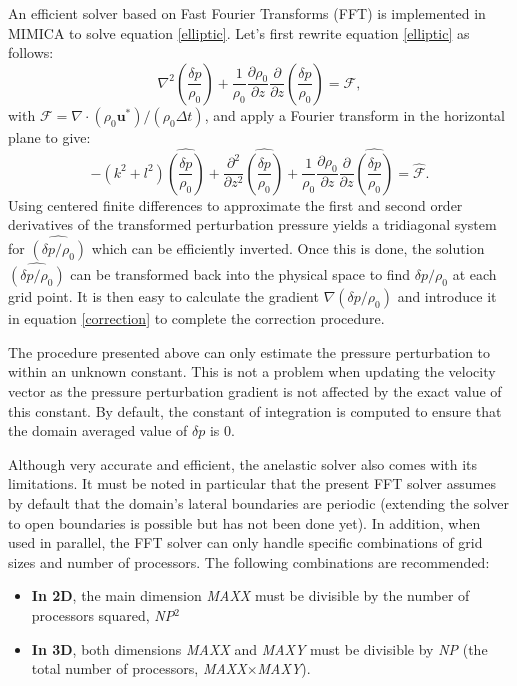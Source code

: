 \documentclass[12pt,A4,french]{article}
\begin{document}
An efficient solver based on Fast Fourier Transforms (FFT) is implemented in MIMICA to solve equation \ref{elliptic}. Let's first rewrite equation \ref{elliptic} as follows:
\begin{equation}
\nabla^{2}\left(\frac{\delta p}{\rho_0}\right) + \frac{1}{\rho_0}\frac{\partial \rho_0}{\partial z}\frac{\partial}{\partial z}\left(\frac{\delta p}{\rho_0}\right) = \mathcal{F},
\end{equation}
with $\mathcal{F}=\nabla\cdot\left(\rho_0 {\mathbf u}^{*}\right) / \left(\rho_0 \Delta t\right)$, and apply a Fourier transform in the horizontal plane to give:
\begin{equation}
-\left(k^{2} + l^{2}\right)\widehat{\left(\frac{\delta p}{\rho_0}\right)} + \frac{\partial^{2}}{\partial z^{2}} \widehat{\left(\frac{\delta p}{\rho_0}\right)} + \frac{1}{\rho_0}\frac{\partial \rho_0}{\partial z}\frac{\partial}{\partial z} \widehat{\left(\frac{\delta p}{\rho_0}\right)} = \widehat{\mathcal{F}}. 
\end{equation}
Using centered finite differences to approximate the first and second order derivatives of the transformed perturbation pressure yields a tridiagonal system for $\widehat{\left(\delta p/\rho_0\right)}$ which can be efficiently inverted. Once this is done, the solution $\widehat{\left(\delta p/\rho_0\right)}$ can be transformed back into the physical space to find $\delta p/\rho_0$ at each grid point. It is then easy to calculate the gradient $\nabla\left(\delta p/\rho_0\right)$ and introduce it in equation \ref{correction} to complete the correction procedure. 

The procedure presented above can only estimate the pressure perturbation to within an unknown constant. This is not a problem when updating the velocity vector as the pressure perturbation gradient is not affected by the exact value of this constant. By default, the constant of integration is computed to ensure that the domain averaged value of $\delta p$ is 0. 

Although very accurate and efficient, the anelastic solver also comes with its limitations. It must be noted in particular that the present FFT solver assumes by default that the domain's lateral boundaries are periodic (extending the solver to open boundaries is possible but has not been done yet). In addition, when used in parallel, the FFT solver can only handle specific combinations of grid sizes and number of processors. The following combinations are recommended:
\begin{itemize}
    \item \textbf{In 2D}, the main dimension {\it MAXX} must be divisible by the number of processors squared, {\it NP$^2$}
    \item \textbf{In 3D}, both dimensions {\it MAXX} and {\it MAXY} must be divisible by {\it NP} (the total number of processors, {\it MAXX$\times$MAXY}).
\end{itemize}
\end{document}

